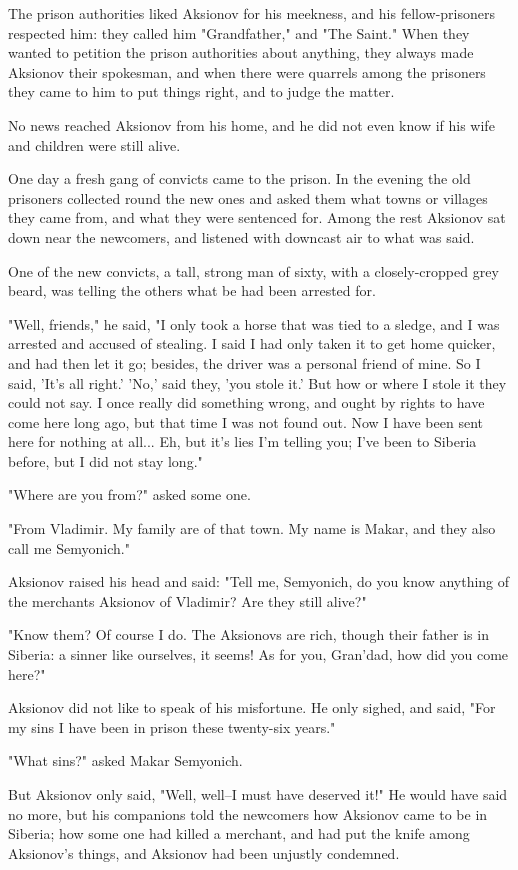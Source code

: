 The prison authorities liked Aksionov for his meekness, and his
fellow-prisoners respected him: they called him "Grandfather," and
"The Saint." When they wanted to petition the prison authorities about
anything, they always made Aksionov their spokesman, and when there
were quarrels among the prisoners they came to him to put things
right, and to judge the matter.

No news reached Aksionov from his home, and he did not even know if
his wife and children were still alive.

One day a fresh gang of convicts came to the prison. In the evening
the old prisoners collected round the new ones and asked them what
towns or villages they came from, and what they were sentenced for.
Among the rest Aksionov sat down near the newcomers, and listened with
downcast air to what was said.

One of the new convicts, a tall, strong man of sixty, with a
closely-cropped grey beard, was telling the others what be had been
arrested for.

"Well, friends," he said, "I only took a horse that was tied to a
sledge, and I was arrested and accused of stealing. I said I had only
taken it to get home quicker, and had then let it go; besides, the
driver was a personal friend of mine. So I said, 'It's all right.'
'No,' said they, 'you stole it.' But how or where I stole it they
could not say. I once really did something wrong, and ought by rights
to have come here long ago, but that time I was not found out. Now I
have been sent here for nothing at all... Eh, but it's lies I'm
telling you; I've been to Siberia before, but I did not stay long."

"Where are you from?" asked some one.

"From Vladimir. My family are of that town. My name is Makar, and they
also call me Semyonich."

Aksionov raised his head and said: "Tell me, Semyonich, do you know
anything of the merchants Aksionov of Vladimir? Are they still alive?"

"Know them? Of course I do. The Aksionovs are rich, though their
father is in Siberia: a sinner like ourselves, it seems! As for you,
Gran'dad, how did you come here?"

Aksionov did not like to speak of his misfortune. He only sighed, and
said, "For my sins I have been in prison these twenty-six years."

"What sins?" asked Makar Semyonich.

But Aksionov only said, "Well, well--I must have deserved it!" He
would have said no more, but his companions told the newcomers how
Aksionov came to be in Siberia; how some one had killed a merchant,
and had put the knife among Aksionov's things, and Aksionov had been
unjustly condemned.

